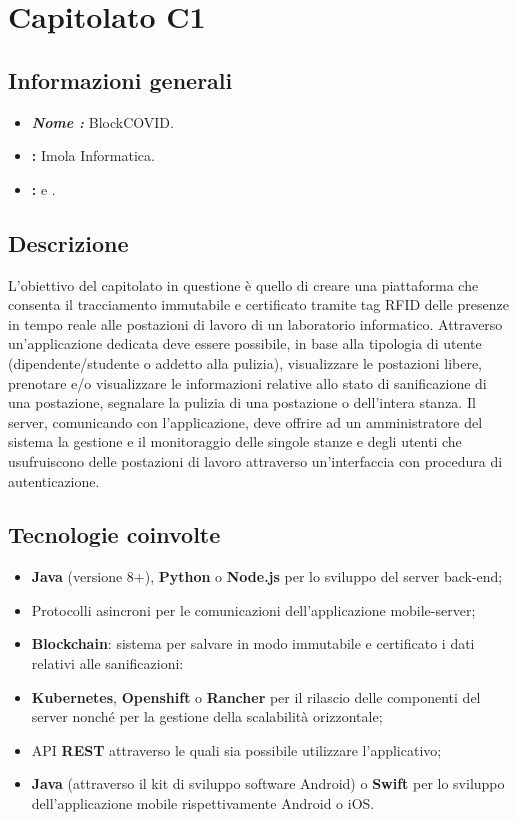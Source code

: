 \section{Capitolato C1}

\subsection{Informazioni generali}{
\begin{itemize}
\item \textbf{\emph{Nome :}} BlockCOVID.
\item \textbf{\commitProg:} Imola Informatica.
\item \textbf{\proponProg:} \VT{} e \CR.
\end{itemize}
}

\subsection{Descrizione}{
L'obiettivo del capitolato in questione è quello di creare una piattaforma che consenta il tracciamento immutabile e certificato tramite tag RFID delle presenze in tempo reale alle postazioni di lavoro di un laboratorio informatico. Attraverso un'applicazione dedicata deve essere possibile, in base alla tipologia di utente (dipendente/studente o addetto alla pulizia), visualizzare le postazioni libere, prenotare e/o visualizzare le informazioni relative allo stato di sanificazione di una postazione, segnalare la pulizia di una postazione o dell'intera stanza. Il server, comunicando con l'applicazione, deve offrire ad un amministratore del sistema la gestione e il monitoraggio delle singole stanze e degli utenti che usufruiscono delle postazioni di lavoro attraverso un'interfaccia con procedura di autenticazione.

}

\subsection{Tecnologie coinvolte}{
\begin{itemize}
\item \textbf{Java} (versione 8+), \textbf{Python} o \textbf{Node.js} per lo sviluppo del server back-end;
\item Protocolli asincroni per le comunicazioni dell'applicazione mobile-server;
\item \textbf{Blockchain}: sistema per salvare in modo immutabile e certificato i dati relativi alle sanificazioni:
\item \textbf{Kubernetes}, \textbf{Openshift} o \textbf{Rancher} per il rilascio delle componenti
del server nonché per la gestione della scalabilità orizzontale;
\item API \textbf{REST} attraverso le quali sia possibile utilizzare l'applicativo;
\item \textbf{Java} (attraverso il kit di sviluppo software Android) o \textbf{Swift} per lo sviluppo dell'applicazione mobile rispettivamente Android o iOS.
\end{itemize}
}


